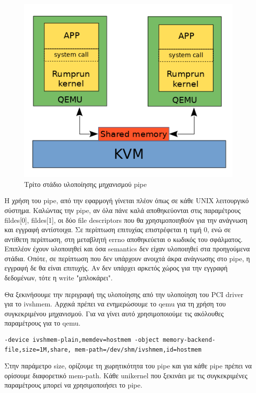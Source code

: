 \begin{figure}[htp]
\centering
\includegraphics[scale=0.7]{figures/pipe_stage3.png}
\caption{Τρίτο στάδιο υλοποίησης μηχανισμού pipe\label{fig4_4}}
\end{figure}

Η χρήση του pipe, από την εφαρμογή γίνεται πλέον όπως σε κάθε UNIX λειτουργικό
σύστημα. Καλώντας την pipe, αν όλα πάνε καλά αποθηκεύονται στις
παραμέτρους fildes[0], fildes[1], οι δύο file descriptors που θα χρησιμοποιηθούν
για την ανάγνωση και εγγραφή αντίστοιχα. Σε περίπτωση επιτυχίας επιστρέφεται η
τιμή 0, ενώ σε αντίθετη περίπτωση, στη μεταβλητή errno αποθηκεύεται ο κωδικός
του σφάλματος. Επιπλέον έχουν υλοποιηθεί και όσα semantics δεν είχαν υλοποιηθεί
στα προηγούμενα στάδια. Οπότε, σε περίπτωση που δεν υπάρχουν ανοιχτά άκρα
ανάγνωσης στο pipe, η εγγραφή δε θα είναι επιτυχής. Αν δεν υπάρχει αρκετός χώρος
για την εγγραφή δεδομένων, τότε η write "μπλοκάρει".

Θα ξεκινήσουμε την περιγραφή της υλοποίησης από την υλοποίηση του PCI driver για
το ivshmem. Αρχικά πρέπει να ενημερώσουμε το qemu για τη χρήση του συγκεκριμένου
μηχανισμού. Για να γίνει αυτό χρησιμοποιούμε τις ακόλουθες παραμέτρους για το qemu.
\begin{lstlisting}[numbers=none]
-device ivshmem-plain,memdev=hostmem -object memory-backend-file,size=1M,share, mem-path=/dev/shm/ivshmem,id=hostmem
\end{lstlisting}
Στην παράμετρο size, ορίζουμε τη χωρητικότητα του pipe και για κάθε pipe πρέπει
να ορίσουμε διαφορετικό mem-path. Κάθε unikernel που ξεκινάει με τις
συγκεκριμένες παραμέτρους μπορεί να χρησιμοποιήσει το pipe. 

